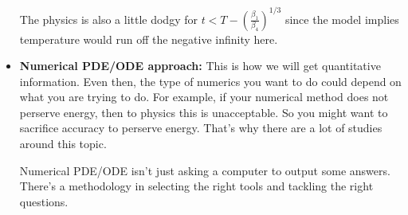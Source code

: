\documentclass{article}
\begin{document}
\begin{example}
\begin{itemize}
        The physics is also a little dodgy for $t < T - (\frac{\beta_1}{\beta_4})^{1/3}$ since the model implies temperature would run off the negative infinity here.
        \item \textbf{Numerical PDE/ODE approach: } This is how we will get quantitative information. Even then, the type of numerics you want to do could depend on what you are trying to do. For example, if your numerical method does not perserve energy, then to physics this is unacceptable. So you might want to sacrifice accuracy to perserve energy. That's why there are a lot of studies around this topic.

        Numerical PDE/ODE isn't just asking a computer to output some answers. There's a methodology in selecting the right tools and tackling the right questions.
     \end{itemize}
 \end{example}
\end{document}
